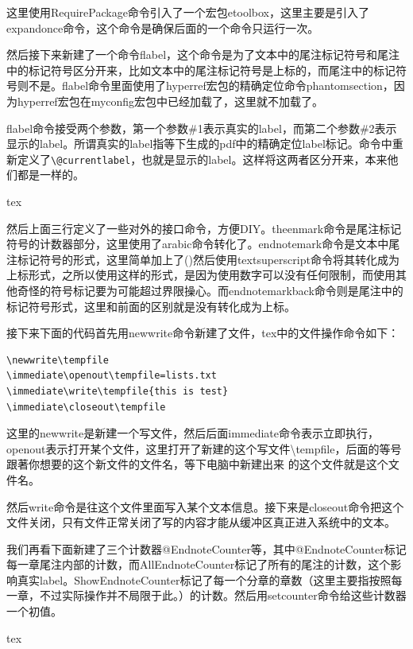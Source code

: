 \documentclass[11pt,oneside]{book}
\begin{document}
\begin{common-format}
这里使用RequirePackage命令引入了一个宏包etoolbox，这里主要是引入了expandonce命令，这个命令是确保后面的一个命令只运行一次。

然后接下来新建了一个命令flabel，这个命令是为了文本中的尾注标记符号和尾注中的标记符号区分开来，比如文本中的尾注标记符号是上标的，而尾注中的标记符号则不是。flabel命令里面使用了hyperref宏包的精确定位命令phantomsection，因为hyperref宏包在myconfig宏包中已经加载了，这里就不加载了。

flabel命令接受两个参数，第一个参数\#{}1表示真实的label，而第二个参数\#{}2表示显示的label。所谓真实的label指等下生成的pdf中的精确定位label标记。命令中重新定义了\verb+\@currentlabel+，也就是显示的label。这样将这两者区分开来，本来他们都是一样的。
\begin{cverbatim}{tex}
\RequirePackage{etoolbox}
\DeclareRobustCommand*{\flabel}[2]%
{\phantomsection \def\@currentlabel{#2}
\label{#1}}%

\gdef\theenmark{\arabic{@EndnoteCounter}}%
\gdef\endnotemark{\textsuperscript{(\theenmark)}}%
\gdef\endnotemarkback{(\theenmark)}%
\end{cverbatim}

然后上面三行定义了一些对外的接口命令，方便DIY。theenmark命令是尾注标记符号的计数器部分，这里使用了arabic命令转化了。endnotemark命令是文本中尾注标记符号的形式，这里简单加上了()然后使用textsuperscript命令将其转化成为上标形式，之所以使用这样的形式，是因为使用数字可以没有任何限制，而使用其他奇怪的符号标记要为可能超过界限操心。而endnotemarkback命令则是尾注中的标记符号形式，这里和前面的区别就是没有转化成为上标。

接下来下面的代码首先用newwrite命令新建了文件，tex中的文件操作命令如下：
\begin{Verbatim}
\newwrite\tempfile
\immediate\openout\tempfile=lists.txt
\immediate\write\tempfile{this is test}
\immediate\closeout\tempfile
\end{Verbatim}
这里的newwrite是新建一个写文件，然后后面immediate命令表示立即执行，openout表示打开某个文件，这里打开了新建的这个写文件\textbackslash tempfile，后面的等号跟著你想要的这个新文件的文件名，等下电脑中新建出来 的这个文件就是这个文件名。

然后write命令是往这个文件里面写入某个文本信息。接下来是closeout命令把这个文件关闭，只有文件正常关闭了写的内容才能从缓冲区真正进入系统中的文本。

我们再看下面新建了三个计数器@EndnoteCounter等，其中@EndnoteCounter标记每一章尾注内部的计数，而AllEndnoteCounter标记了所有的尾注的计数，这个影响真实label。ShowEndnoteCounter标记了每一个分章的章数（这里主要指按照每一章，不过实际操作并不局限于此。）的计数。然后用setcounter命令给这些计数器一个初值。
\begin{cverbatim}{tex}
\newwrite\@entout


\end{cverbatim}
\end{common-format}
\end{document}
